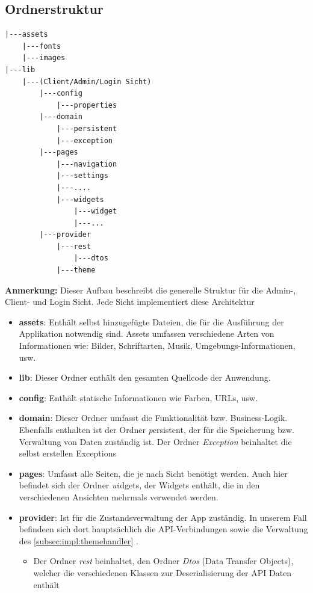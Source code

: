 \newpage
{}\label{sec:architecureflutter}
\subsection{Ordnerstruktur }\label{Ordnerstruktur}
 \begin{verbatim}
|---assets
    |---fonts
    |---images
|---lib
    |---(Client/Admin/Login Sicht)
        |---config
            |---properties
        |---domain
            |---persistent
            |---exception
        |---pages
            |---navigation
            |---settings
            |---....
            |---widgets
                |---widget
                |---...
        |---provider
            |---rest
                |---dtos
            |---theme
\end{verbatim}
{\bf{Anmerkung}:} Dieser Aufbau beschreibt die generelle Struktur für die Admin-, Client- und Login Sicht. Jede Sicht implementiert diese Architektur


\begin{itemize}
    \item \textbf{assets}: Enthält selbst hinzugefügte Dateien, die für die Ausführung der Applikation notwendig sind. Assets umfassen verschiedene Arten von Informationen wie: Bilder, Schriftarten, Musik, Umgebungs-Informationen, usw.
    \item \textbf{lib}: Dieser Ordner enthält den gesamten Quellcode der Anwendung.
    \item \textbf{config}: Enthält statische Informationen wie Farben, URLs, usw. 
    \item \textbf{domain}: Dieser Ordner umfasst die Funktionalität bzw. Business-Logik. Ebenfalls enthalten ist der Ordner {\textit persistent}, der für die Speicherung bzw. Verwaltung von Daten zuständig ist. Der Ordner {\textit{Exception}} beinhaltet die selbst erstellen Exceptions
    \item \textbf{pages}: Umfasst alle Seiten, die je nach Sicht benötigt werden. Auch hier befindet sich der Ordner {\textit widgets}, der Widgets enthält, die in den verschiedenen Ansichten mehrmals verwendet werden.
    \item \textbf{provider}: Ist für die Zustandsverwaltung der App zuständig. In unserem Fall befindeen sich dort hauptsächlich die API-Verbindungen sowie die Verwaltung des \ref{subsec:impl:themehandler} .
    \begin{itemize}
        \item Der Ordner {\textit{rest}} beinhaltet, den Ordner {\textit{Dtos}} (Data Transfer Objects), welcher die verschiedenen Klassen zur Deserialisierung der API Daten enth\"alt
    \end{itemize}
\end{itemize}
\newpage

